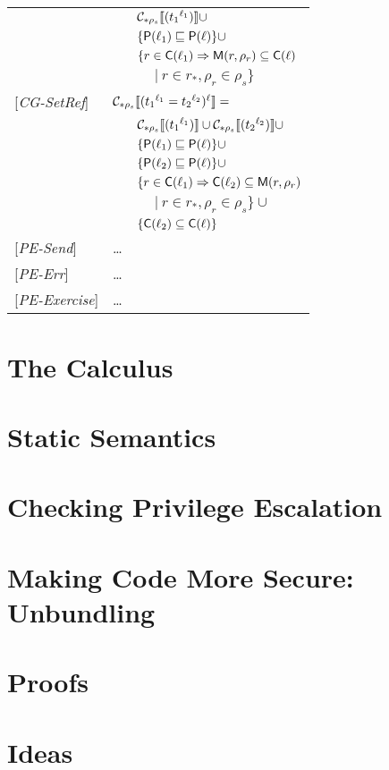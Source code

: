 \documentclass[[12pt,a4paper,twoside,openrigh]{article}
\newcommand{\lbt}[1]{{t_#1}^{\ell_#1}}
\begin{document}
\begin{tabular} {l l l l}
&&\multicolumn{2}{l}{$ \gen {\lbt 1} \cup$}\\
&&\multicolumn{2}{l}{$\{ \mathsf{P}(\ell_1) \sqsubseteq \mathsf{P}(\ell) \} \cup$}\\
&&\multicolumn{2}{l}{$\{r \in \mathsf{C}(\ell_1) \Rightarrow \mathsf{M}(r, \rho_r) \subseteq \mathsf{C}(\ell)$} \\
&&&$|\ r \in r_*, \rho_r \in \rho_s\}$\\
{[\textit{CG-SetRef}]}&\multicolumn{3}{l}{$\genl {\setref {\lbt 1} {\lbt 2}} = $}\\
&&\multicolumn{2}{l}{$ \gen {\lbt 1} \cup \gen {\lbt 2} \cup $}\\
&&\multicolumn{2}{l}{$ \{ \mathsf{P}(\ell_1) \sqsubseteq \mathsf{P}(\ell) \} \cup$}\\
&&\multicolumn{2}{l}{$ \{ \mathsf{P}(\ell_2) \sqsubseteq \mathsf{P}(\ell) \} \cup$}\\
&&\multicolumn{2}{l}{$\{r \in \mathsf{C}(\ell_1) \Rightarrow \mathsf{C}(\ell_2) \subseteq \mathsf{M}(r, \rho_r)$}\\
&&&$|\ r \in r_*, \rho_r \in \rho_s\}\cup$ \\
&&\multicolumn{2}{l}{$\{ \mathsf{C}(\ell_2) \subseteq \mathsf{C}(\ell) \}$} \\
{[\textit{PE-Send}]}& \dots \\
{[\textit{PE-Err}]}& \dots \\
{[\textit{PE-Exercise}]}& \dots \\
\end{tabular}



\section{The Calculus}
\label{sec:calculus}


\section{Static Semantics}
\label{sec:statics}


\section{Checking Privilege Escalation}
\label{sec:privesc}

\newpage

\section{Making Code More Secure: Unbundling}
\label{sec:flow}

\newpage

\section{Proofs}
\label{sec:proofs}

\newpage

\section{Ideas}
\label{sec:ideas}
\end{document}
